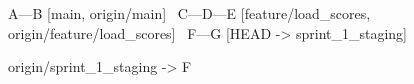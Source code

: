 \begin{gitpanel}
A---B [main, origin/main]
     \
      C---D---E [feature/load_scores, origin/feature/load_scores]
       \
        F---G [HEAD -> sprint_1_staging]

origin/sprint_1_staging -> F
\end{gitpanel}
